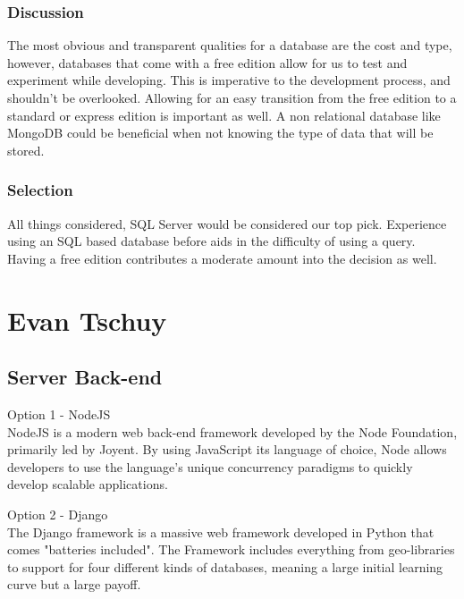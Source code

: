 \documentclass[onecolumn, draftclsnofoot,10pt, compsoc]{IEEEtran}
\begin{document}
{\medskip

\subsubsection{Discussion}
\noindent The most obvious and transparent qualities for a database are the cost and type, however, databases that come with a free edition allow for us to test and experiment while developing. This is imperative to the development process, and shouldn't be overlooked. Allowing for an easy transition from the free edition to a standard or express edition is important as well. A non relational database like MongoDB could be beneficial when not knowing the type of data that will be stored. 


\subsubsection{Selection}
\noindent All things considered, SQL Server would be considered our top pick. Experience using an SQL based database before aids in the difficulty of using a query. Having a free edition contributes a moderate amount into the decision as well.








%
\newpage
\section{Evan Tschuy}

\subsection{Server Back-end}
\noindent Option 1 - NodeJS \\
\noindent NodeJS is a modern web back-end framework developed by the Node Foundation,
primarily led by Joyent. By using JavaScript its language of choice, Node allows
developers to use the language's unique concurrency paradigms to quickly develop
scalable applications. 

\medskip

\noindent Option 2 - Django \\
\noindent The Django framework is a massive web framework developed in Python that comes "batteries
included". The Framework includes everything from geo-libraries to support for four different kinds of
databases, meaning a large initial learning curve but a large payoff. 

}
\end{document}
